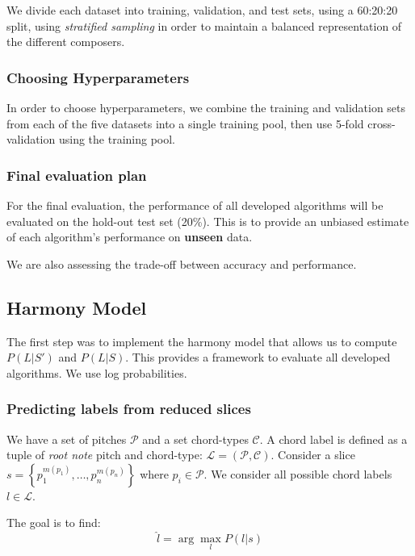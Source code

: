 \documentclass[12pt,a4paper,twoside,openright]{report}
\theoremstyle{definition}
\begin{document}
We divide each dataset into training, validation, and test sets, using a 60:20:20 split, using \textit{stratified sampling} in order to maintain a balanced representation of the different composers.

\subsubsection{Choosing Hyperparameters}

In order to choose hyperparameters, we combine the training and validation sets from each of the five datasets into a single training pool, then use 5-fold cross-validation using the training pool. 

\subsubsection{Final evaluation plan}

For the final evaluation, the performance of all developed algorithms will be evaluated on the hold-out test set (20\%). This is to provide an unbiased estimate of each algorithm's performance on \textbf{unseen} data.

We are also assessing the trade-off between accuracy and performance.

\subsection{Harmony Model}

The first step was to implement the harmony model that allows us to compute $P(L|S')$ and $P(L|S)$. This provides a framework to evaluate all developed algorithms. We use log probabilities.


\subsubsection{Predicting labels from reduced slices}
We have a set of pitches $\mathcal{P}$ and a set chord-types $\mathcal{C}$.
A chord label is defined as a tuple of \textit{root note} pitch and chord-type: $\mathcal{L} = (\mathcal{P}, \mathcal{C})$. 
Consider a slice $s = \left\{ p_1^{m(p_1)} , \dots, p_n^{m(p_n)} \right\}$ where $p_i \in \mathcal{P}$. We consider all possible chord labels $l \in \mathcal{L}$.

The goal is to find:
\begin{equation}
  \hat{l} = \arg\max_l P(l|s)
  \label{eq:}
\end{equation}
\end{document}
